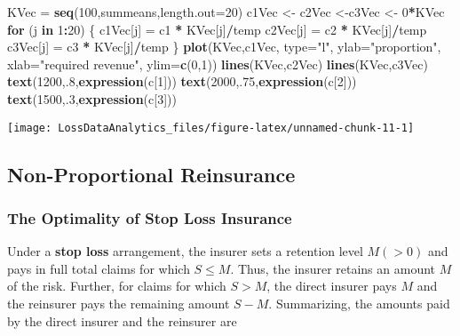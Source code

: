 \documentclass[]{book}
\newenvironment{Shaded}{\begin{snugshade}}{\end{snugshade}}
\newcommand{\KeywordTok}[1]{\textcolor[rgb]{0.13,0.29,0.53}{\textbf{#1}}}
\newcommand{\DataTypeTok}[1]{\textcolor[rgb]{0.13,0.29,0.53}{#1}}
\newcommand{\DecValTok}[1]{\textcolor[rgb]{0.00,0.00,0.81}{#1}}
\newcommand{\StringTok}[1]{\textcolor[rgb]{0.31,0.60,0.02}{#1}}
\newcommand{\ControlFlowTok}[1]{\textcolor[rgb]{0.13,0.29,0.53}{\textbf{#1}}}
\newcommand{\OperatorTok}[1]{\textcolor[rgb]{0.81,0.36,0.00}{\textbf{#1}}}
\newcommand{\NormalTok}[1]{#1}
\theoremstyle{definition}
\theoremstyle{definition}
\theoremstyle{definition}
\theoremstyle{remark}
\begin{document}
\begin{Shaded}
\begin{Highlighting}[]
\NormalTok{KVec =}\StringTok{ }\KeywordTok{seq}\NormalTok{(}\DecValTok{100}\NormalTok{,summeans,}\DataTypeTok{length.out=}\DecValTok{20}\NormalTok{)}
\NormalTok{c1Vec <-}\StringTok{ }\NormalTok{c2Vec <-c3Vec <-}\StringTok{ }\DecValTok{0}\OperatorTok{*}\NormalTok{KVec }
\ControlFlowTok{for}\NormalTok{ (j }\ControlFlowTok{in} \DecValTok{1}\OperatorTok{:}\DecValTok{20}\NormalTok{) \{}
\NormalTok{  c1Vec[j] =}\StringTok{ }\NormalTok{c1 }\OperatorTok{*}\StringTok{ }\NormalTok{KVec[j]}\OperatorTok{/}\NormalTok{temp}
\NormalTok{  c2Vec[j] =}\StringTok{ }\NormalTok{c2 }\OperatorTok{*}\StringTok{ }\NormalTok{KVec[j]}\OperatorTok{/}\NormalTok{temp}
\NormalTok{  c3Vec[j] =}\StringTok{ }\NormalTok{c3 }\OperatorTok{*}\StringTok{ }\NormalTok{KVec[j]}\OperatorTok{/}\NormalTok{temp}
\NormalTok{  \}}
\KeywordTok{plot}\NormalTok{(KVec,c1Vec, }\DataTypeTok{type=}\StringTok{"l"}\NormalTok{, }\DataTypeTok{ylab=}\StringTok{"proportion"}\NormalTok{, }\DataTypeTok{xlab=}\StringTok{"required revenue"}\NormalTok{, }\DataTypeTok{ylim=}\KeywordTok{c}\NormalTok{(}\DecValTok{0}\NormalTok{,}\DecValTok{1}\NormalTok{))}
\KeywordTok{lines}\NormalTok{(KVec,c2Vec)}
\KeywordTok{lines}\NormalTok{(KVec,c3Vec)}
\KeywordTok{text}\NormalTok{(}\DecValTok{1200}\NormalTok{,.}\DecValTok{8}\NormalTok{,}\KeywordTok{expression}\NormalTok{(c[}\DecValTok{1}\NormalTok{]))}
\KeywordTok{text}\NormalTok{(}\DecValTok{2000}\NormalTok{,.}\DecValTok{75}\NormalTok{,}\KeywordTok{expression}\NormalTok{(c[}\DecValTok{2}\NormalTok{]))}
\KeywordTok{text}\NormalTok{(}\DecValTok{1500}\NormalTok{,.}\DecValTok{3}\NormalTok{,}\KeywordTok{expression}\NormalTok{(c[}\DecValTok{3}\NormalTok{]))}
\end{Highlighting}
\end{Shaded}

\begin{center}\texttt{[image: LossDataAnalytics\_files/figure-latex/unnamed-chunk-11-1]} \end{center}

\subsection{Non-Proportional Reinsurance}\label{S:NonProportionalRe}

\subsubsection{The Optimality of Stop Loss
Insurance}\label{the-optimality-of-stop-loss-insurance}

Under a \textbf{stop loss} arrangement, the insurer sets a retention
level \(M (>0)\) and pays in full total claims for which \(S \le M\).
Thus, the insurer retains an amount \(M\) of the risk. Further, for
claims for which \(S > M\), the direct insurer pays \(M\) and the
reinsurer pays the remaining amount \(S-M\). Summarizing, the amounts
paid by the direct insurer and the reinsurer are
\end{document}
